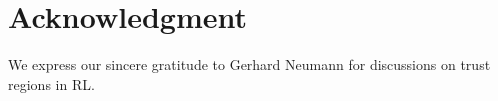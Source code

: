 \section*{Acknowledgment}

We express our sincere gratitude to Gerhard Neumann for discussions on trust regions in \ac{RL}.